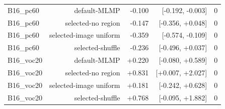 \begin{table}[htbp]
\begin{tabular}{lrrrr}
B16\_pc60 & default-MLMP & -0.100 & [-0.192, -0.003] & 0 \\
B16\_pc60 & selected-no region & -0.147 & [-0.356, +0.048] & 0 \\
B16\_pc60 & selected-image uniform & -0.359 & [-0.574, -0.109] & 0 \\
B16\_pc60 & selected-shuffle & -0.236 & [-0.496, +0.037] & 0 \\
B16\_voc20 & default-MLMP & +0.220 & [-0.080, +0.589] & 0 \\
B16\_voc20 & selected-no region & +0.831 & [+0.007, +2.027] & 0 \\
B16\_voc20 & selected-image uniform & +0.181 & [-0.242, +0.628] & 0 \\
B16\_voc20 & selected-shuffle & +0.768 & [-0.095, +1.882] & 0 \\
\bottomrule
\end{tabular}
\end{table}
